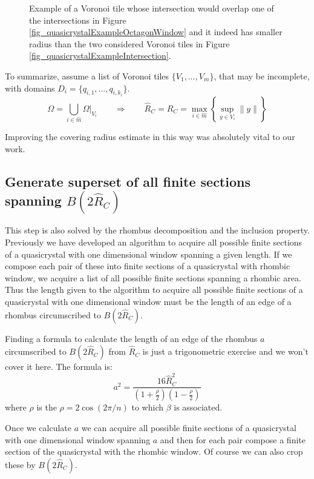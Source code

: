 \documentclass[text.tex]{subfiles}
\begin{document}
\begin{figure}[h!]
\begin{minipage}{0.4\textwidth}
\end{minipage}
\caption{Example of a Voronoi tile whose intersection would overlap one of the intersections in Figure \ref{fig_quasicrystalExampleOctagonWindow} and it indeed has smaller radius than the two considered Voronoi tiles in Figure \ref{fig_quasicrystalExampleIntersection}. }
\label{fig_quasicrystalExampleIntersection02}
\end{figure}

To summarize, assume a list of Voronoi tiles $\{V_1,\dots,V_m\}$, that may be incomplete, with domains $D_i = \{q_{i,1},\dots,q_{i,k_i}\}$. 
$$\Omega = \bigcup\limits_{i\in\hat{m}}\Omega|_{V_i} \qquad\Rightarrow\qquad \hat{R}_C = R_C = \max_{i\in\hat{m}}\left\{\sup_{y\in V_i}\lVert y\rVert\right\}$$

Improving the covering radius estimate in this way was absolutely vital to our work. 

\subsection{Generate superset of all finite sections spanning $B(2\hat{R}_C)$}
This step is also solved by the rhombus decomposition and the inclusion property. Previously we have developed an algorithm to acquire all possible finite sections of a quasicrystal with one dimensional window spanning a given length. If we compose each pair of these into finite sections of a quasicrystal with rhombic window, we acquire a list of all possible finite sections spanning a rhombic area. Thus the length given to the algorithm to acquire all possible finite sections of a quasicrystal with one dimensional window must be the length of an edge of a rhombus circumscribed to $B(2\hat{R}_C)$. 

Finding a formula to calculate the length of an edge of the rhombus $a$ circumscribed to $B(2\hat{R}_C)$ from $\hat{R}_C$ is just a trigonometric exercise and we won't cover it here. The formula is: 
$$a^2 = \frac{16\hat{R}_C^2}{\left(1+\frac{\rho}{2}\right)\left(1-\frac{\rho}{2}\right)}$$
where $\rho$ is the $\rho=2\cos\left(2\pi/n\right)$ to which $\beta$ is associated. 

Once we calculate $a$ we can acquire all possible finite sections of a quasicrystal with one dimensional window spanning $a$ and then for each pair compose a finite section of the quasicrystal with the rhombic window. Of course we can also crop these by $B(2\hat{R}_C)$. 
\end{document}

